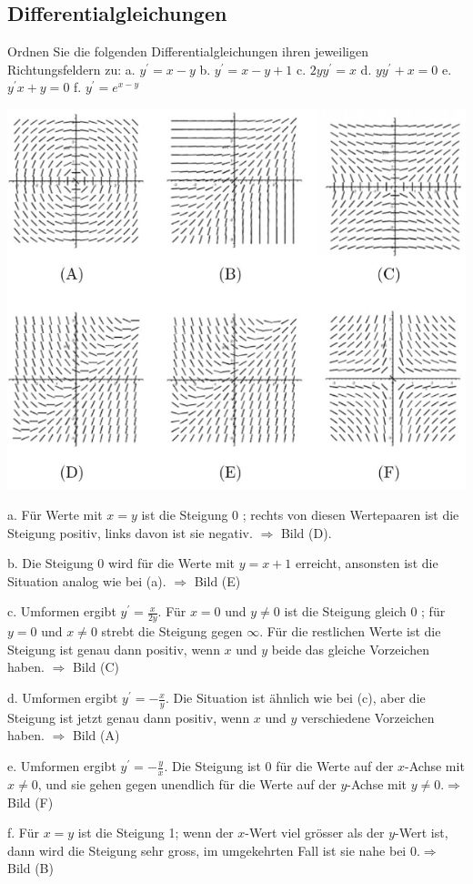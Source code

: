 \subsection*{Differentialgleichungen}

\begin{example}
Ordnen Sie die folgenden Differentialgleichungen ihren jeweiligen Richtungsfeldern zu:
a. $y^{\prime}=x-y$
b. $y^{\prime}=x-y+1$
c. $2 y y^{\prime}=x$
d. $y y^{\prime}+x=0$
e. $y^{\prime} x+y=0$
f. $y^{\prime}=e^{x-y}$

\includegraphics[width=1\linewidth]{images/richtungsfelder.png}

a. Für Werte mit $x=y$ ist die Steigung 0 ; rechts von diesen Wertepaaren ist die Steigung positiv, links davon ist sie negativ. $\Rightarrow$ Bild (D).

b. Die Steigung 0 wird für die Werte mit $y=x+1$ erreicht, ansonsten ist die Situation analog wie bei (a). $\Rightarrow$ Bild (E)

c. Umformen ergibt $y^{\prime}=\frac{x}{2 y}$. Für $x=0$ und $y \neq 0$ ist die Steigung gleich 0 ; für $y=0$ und $x \neq 0$ strebt die Steigung gegen $\infty$. Für die restlichen Werte ist die Steigung ist genau dann positiv, wenn $x$ und $y$ beide das gleiche Vorzeichen haben. $\Rightarrow$ Bild (C)

d. Umformen ergibt $y^{\prime}=-\frac{x}{y}$. Die Situation ist ähnlich wie bei (c), aber die Steigung ist jetzt genau dann positiv, wenn $x$ und $y$ verschiedene Vorzeichen haben. $\Rightarrow$ Bild (A)

e. Umformen ergibt $y^{\prime}=-\frac{y}{x}$. Die Steigung ist 0 für die Werte auf der $x$-Achse mit $x \neq 0$, und sie gehen gegen unendlich für die Werte auf der $y$-Achse mit $y \neq 0 . \Rightarrow$ Bild (F)

f. Für $x=y$ ist die Steigung 1; wenn der $x$-Wert viel grösser als der $y$-Wert ist, dann wird die Steigung sehr gross, im umgekehrten Fall ist sie nahe bei $0 . \Rightarrow$ Bild (B)

\end{example}

